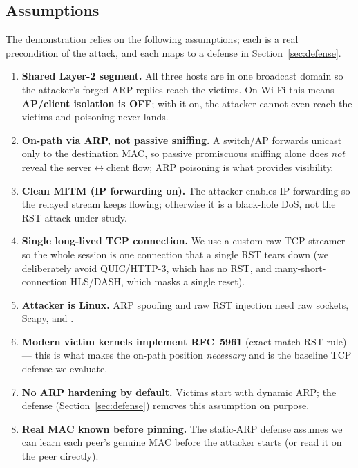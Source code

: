 \documentclass[11pt,a4paper]{article}
\newcommand{\code}[1]{\texttt{\detokenize{#1}}}
\begin{document}
\subsection{Assumptions}
The demonstration relies on the following assumptions; each is a real
precondition of the attack, and each maps to a defense in
Section~\ref{sec:defense}.
\begin{enumerate}[leftmargin=1.4em,itemsep=2pt]
  \item \textbf{Shared Layer-2 segment.} All three hosts are in one broadcast
        domain so the attacker's forged ARP replies reach the victims. On Wi-Fi
        this means \textbf{AP/client isolation is OFF}; with it on, the attacker
        cannot even reach the victims and poisoning never lands.
  \item \textbf{On-path via ARP, not passive sniffing.} A switch/AP forwards
        unicast only to the destination MAC, so passive promiscuous sniffing
        alone does \emph{not} reveal the server$\leftrightarrow$client flow; ARP
        poisoning is what provides visibility.
  \item \textbf{Clean MITM (IP forwarding on).} The attacker enables IP
        forwarding so the relayed stream keeps flowing; otherwise it is a
        black-hole DoS, not the RST attack under study.
  \item \textbf{Single long-lived TCP connection.} We use a custom raw-TCP
        streamer so the whole session is one connection that a single RST tears
        down (we deliberately avoid QUIC/HTTP-3, which has no RST, and
        many-short-connection HLS/DASH, which masks a single reset).
  \item \textbf{Attacker is Linux.} ARP spoofing and raw RST injection need raw
        sockets, Scapy, and \code{/proc/sys/net/ipv4/ip_forward}.
  \item \textbf{Modern victim kernels implement RFC~5961} (exact-match RST
        rule) — this is what makes the on-path position \emph{necessary} and is
        the baseline TCP defense we evaluate.
  \item \textbf{No ARP hardening by default.} Victims start with dynamic ARP; the
        defense (Section~\ref{sec:defense}) removes this assumption on purpose.
  \item \textbf{Real MAC known before pinning.} The static-ARP defense assumes we
        can learn each peer's genuine MAC before the attacker starts (or read it
        on the peer directly).
\end{enumerate}
\end{document}
